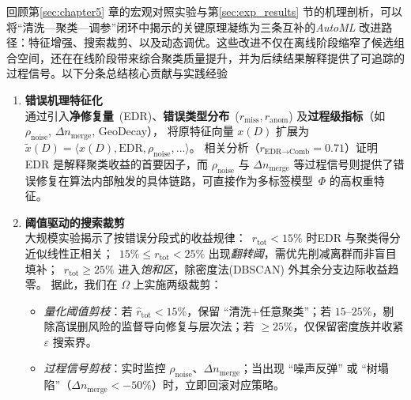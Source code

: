 \documentclass[10pt]{article} %
\numberwithin{equation}{section}
\begin{document}
\textcolor[rgb]{0.00,0.07,1.00}{回顾第\ref{sec:chapter5} 章的宏观对照实验与第\ref{sec:exp_results} 节的机理剖析，可以将“清洗—聚类—调参”闭环中揭示的关键原理凝练为三条互补的\textit{AutoML} 改进路径：特征增强、搜索裁剪、以及动态调优。}这些改进不仅在离线阶段缩窄了候选组合空间，还在在线阶段带来综合聚类质量提升，并为后续结果解释提供了可追踪的过程信号。以下分条总结核心贡献与实践经验

\begin{enumerate}[leftmargin=1.6em,itemsep=4pt]
  \item \textbf{错误机理特征化}  \\
        通过引入\textbf{净修复量}~(EDR)、\textbf{错误类型分布}~($r_{\mathrm{miss}}, r_{\mathrm{anom}}$) 及\textbf{过程级指标}（如~$\rho_{\text{noise}}$, $\Delta n_{\text{merge}}$, GeoDecay），
        将原特征向量 $x(D)$ 扩展为 $\tilde{x}(D)=\langle x(D),\text{EDR},\rho_{\text{noise}},\dots\rangle$。
        相关分析（$r_{ \text{EDR}\rightarrow\text{Comb}}=0.71$）证明 EDR 是解释聚类收益的首要因子，而 $\rho_{\text{noise}}$ 与 $\Delta n_{\text{merge}}$ 等过程信号则提供了错误修复在算法内部触发的具体链路，可直接作为多标签模型~$\Phi$ 的高权重特征。

  \item \textbf{阈值驱动的搜索裁剪}  \\
        大规模实验揭示了按错误分段式的收益规律：~$r_{\mathrm{tot}}\!<\!15\%$ 时\;EDR 与聚类得分近似线性正相关；~$15\%\!\le r_{\mathrm{tot}}\!<\!25\%$ 出现\emph{翻转阈}，需优先削减离群而非盲目填补；~$r_{\mathrm{tot}}\!\ge\!25\%$ 进入\emph{饱和区}，除密度法(DBSCAN) 外其余分支边际收益趋零。  
        据此，我们在 $\Omega$ 上实施两级裁剪：
        \begin{itemize}
          \item \emph{量化阈值剪枝}：若 $\hat{r}_{\mathrm{tot}}\!<\!15\%$，保留 ``清洗$+$任意聚类''；若 $15$--$25\%$，剔除高误删风险的监督导向修复与层次法；若 $\ge\!25\%$，仅保留密度族并收紧 \(\varepsilon\) 搜索界。
          \item \emph{过程信号剪枝}：实时监控 $\rho_{\text{noise}}$、$\Delta n_{\text{merge}}$；当出现 ``噪声反弹'' 或 ``树塌陷''（$\Delta n_{\text{merge}}<-50\%$）时，立即回滚对应策略。
        \end{itemize}


\end{enumerate}
\end{document}
